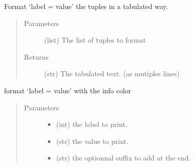 \documentclass[a4paper,10pt,english]{sphinxmanual}
\begin{document}
\begin{fulllineitems}
\label{\detokenize{apidoc_src/src:src.utilsSat.formatTuples}}
Format ‘label = value’ the tuples in a tabulated way.
\begin{quote}\begin{description}
\item[{Parameters}] \leavevmode
{} \textendash{} (list) The list of tuples to format

\item[{Returns}] \leavevmode
(str) The tabulated text. (as mutiples lines)

\end{description}\end{quote}

\end{fulllineitems}


\begin{fulllineitems}
\label{\detokenize{apidoc_src/src:src.utilsSat.formatValue}}
format ‘label = value’ with the info color
\begin{quote}\begin{description}
\item[{Parameters}] \leavevmode\begin{itemize}
\item {} 
 \textendash{} (int) the label to print.

\item {} 
 \textendash{} (str) the value to print.

\item {} 
 \textendash{} (str) the optionnal suffix to add at the end.

\end{itemize}

\end{description}\end{quote}

\end{fulllineitems}
\end{document}

